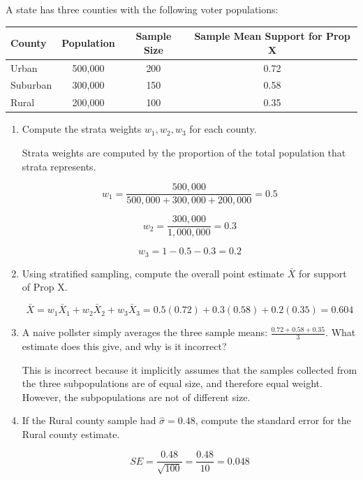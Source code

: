 \documentclass{article}
\begin{document}
A state has three counties with the following voter populations:

\begin{center}
\begin{tabular}{lccc}
\toprule
County & Population & Sample Size & Sample Mean Support for Prop X \\
\midrule
Urban & 500,000 & 200 & 0.72 \\
Suburban & 300,000 & 150 & 0.58 \\
Rural & 200,000 & 100 & 0.35 \\
\bottomrule
\end{tabular}
\end{center}

\begin{enumerate}[label=(\alph*)]
    \item Compute the strata weights $w_1, w_2, w_3$ for each county.

    Strata weights are computed by the proportion of the total population that strata represents.

    \[
        w_1 = \frac{500,000}{500,000 + 300,000 + 200,000} = 0.5
    \]

    \[
        w_2 = \frac{300,000}{1,000,000} = 0.3
    \]

    \[
        w_3 = 1 - 0.5 - 0.3 = 0.2
    \]

    \item Using stratified sampling, compute the overall point estimate $\bar{X}$ for support of Prop X.

    \[
        \bar{X} = w_1\bar{X}_1 + w_2\bar{X}_2 + w_3\bar{X}_3 = 0.5(0.72) + 0.3(0.58) + 0.2(0.35) = 0.604
    \]
    
    \item A naive pollster simply averages the three sample means: $\frac{0.72 + 0.58 + 0.35}{3}$. What estimate does this give, and why is it incorrect?

    This is incorrect because it implicitly assumes that the samples collected from the three subpopulations are of equal size, and therefore equal weight. However, the subpopulations are not of different size.
    
    \item If the Rural county sample had $\hat{\sigma} = 0.48$, compute the standard error for the Rural county estimate.

    \[
        SE = \frac{0.48}{\sqrt{100}} = \frac{0.48}{10} = 0.048
    \]
    
\end{enumerate}
\end{document}
